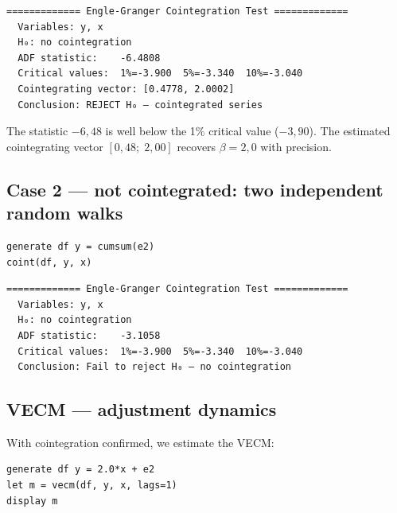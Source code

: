 \begin{lstlisting}[language={}, basicstyle=\ttfamily\small,
  frame=none, numbers=none, backgroundcolor=\color{codbg},
  xleftmargin=0pt, xrightmargin=0pt, breaklines=false]
============= Engle-Granger Cointegration Test =============
  Variables: y, x
  H₀: no cointegration
  ADF statistic:    -6.4808
  Critical values:  1%=-3.900  5%=-3.340  10%=-3.040
  Cointegrating vector: [0.4778, 2.0002]
  Conclusion: REJECT H₀ — cointegrated series
\end{lstlisting}

The statistic $-6{,}48$ is well below the 1\% critical value
($-3{,}90$). The estimated cointegrating vector $[0{,}48;\; 2{,}00]$ recovers
$\beta = 2{,}0$ with precision.

\subsection*{Case 2 — not cointegrated: two independent random walks}

\begin{lstlisting}[caption={Two random walks — no cointegration}]
generate df y = cumsum(e2)
coint(df, y, x)
\end{lstlisting}

\begin{lstlisting}[language={}, basicstyle=\ttfamily\small,
  frame=none, numbers=none, backgroundcolor=\color{codbg},
  xleftmargin=0pt, xrightmargin=0pt, breaklines=false]
============= Engle-Granger Cointegration Test =============
  Variables: y, x
  H₀: no cointegration
  ADF statistic:    -3.1058
  Critical values:  1%=-3.900  5%=-3.340  10%=-3.040
  Conclusion: Fail to reject H₀ — no cointegration
\end{lstlisting}

\subsection*{VECM — adjustment dynamics}

With cointegration confirmed, we estimate the VECM:

\begin{lstlisting}[caption={VECM with rank 1}]
generate df y = 2.0*x + e2
let m = vecm(df, y, x, lags=1)
display m
\end{lstlisting}

